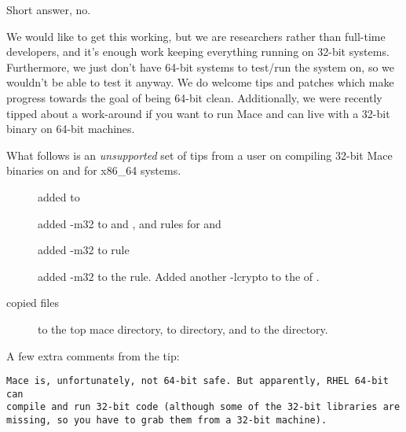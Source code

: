 Short answer, no.

We would like to get this working, but we are researchers rather than
full-time developers, and it's enough work keeping everything running on
32-bit systems.  Furthermore, we just don't have 64-bit systems to
test/run the system on, so we wouldn't be able to test it anyway.  We do
welcome tips and patches which make progress towards the goal of being
64-bit clean.  Additionally, we were recently tipped about a work-around
if you want to run Mace and can live with a 32-bit binary on 64-bit
machines.

What follows is an \emph{unsupported} set of tips from a user on
compiling 32-bit Mace binaries on and for x86\_64 systems.

\begin{description}
\item[] added  to 
\item[] added -m32 to 
and , and rules for  and
\item[] added -m32 to
 rule
\item[] added -m32 to the
 rule. Added another -lcrypto to the
 of .
\item[copied files] 
to the top mace directory,  to  directory, and
 to the  directory.
\end{description}

A few extra comments from the tip:
\begin{verbatim}
Mace is, unfortunately, not 64-bit safe. But apparently, RHEL 64-bit can
compile and run 32-bit code (although some of the 32-bit libraries are
missing, so you have to grab them from a 32-bit machine).
\end{verbatim}

